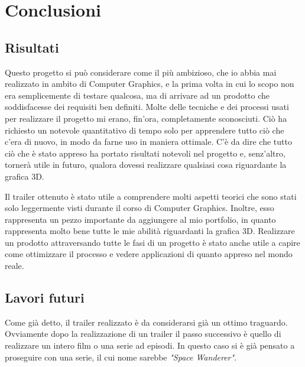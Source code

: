 
\chapter{Conclusioni} %

\label{Chapter6} %


\section{Risultati}
Questo progetto si può considerare come il più ambizioso, che io abbia mai realizzato in ambito di Computer Graphics, e la prima volta in cui lo scopo non era semplicemente di testare qualcosa, ma di arrivare ad un prodotto che soddisfacesse dei requisiti ben definiti.
Molte delle tecniche e dei processi usati per realizzare il progetto mi erano, fin'ora, completamente sconosciuti.
Ciò ha richiesto un notevole quantitativo di tempo solo per apprendere tutto ciò che c'era di nuovo, in modo da farne uso in maniera ottimale.
C'è da dire che tutto ciò che è stato appreso ha portato risultati notevoli nel progetto e, senz'altro, tornerà utile in futuro, qualora dovessi realizzare qualsiasi cosa riguardante la grafica 3D.

Il trailer ottenuto è stato utile a comprendere molti aspetti teorici che sono stati solo leggermente visti durante il corso di Computer Graphics.
Inoltre, esso rappresenta un pezzo importante da aggiungere al mio portfolio, in quanto rappresenta molto bene tutte le mie abilità riguardanti la grafica 3D.
Realizzare un prodotto attraversando tutte le fasi di un progetto è stato anche utile a capire come ottimizzare il processo e vedere applicazioni di quanto appreso nel mondo reale.

\section{Lavori futuri}

Come già detto, il trailer realizzato è da considerarsi già un ottimo traguardo. Ovviamente dopo la realizzazione di un trailer il passo successivo è quello di realizzare un intero film o una serie ad episodi.
In questo caso si è già pensato a proseguire con una serie, il cui nome sarebbe \emph{"Space Wanderer"}.

